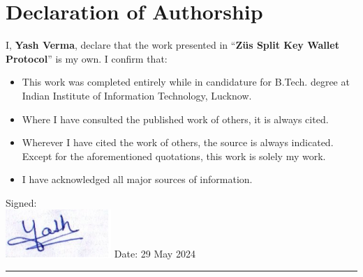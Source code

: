 \setcounter{page}{3}
\chapter*{Declaration of Authorship}
\vspace{1cm}
\noindent I, \textbf{Yash Verma}, declare that the work presented in ``\textbf{Züs Split Key Wallet Protocol}'' is my own. I confirm that:
\medskip
\begin{itemize}
    \item This work was completed entirely while in candidature for B.Tech. degree at Indian Institute of Information Technology, Lucknow.
    \medskip
    \item Where I have consulted the published work of others, it is always cited.
    \medskip
    \item Wherever I have cited the work of others, the source is always indicated. Except for the aforementioned quotations, this work is solely my work.
    \medskip
    \item I have acknowledged all major sources of information.
\end{itemize}
\vspace{2cm}
\noindent Signed:\\
\includegraphics[width=0.3\textwidth]{Images/signature}
\newline
\newline
\newline
\noindent Date: 29 May 2024
\\
\rule[0.5em]{33em}{0.5pt}
\cleardoublepage